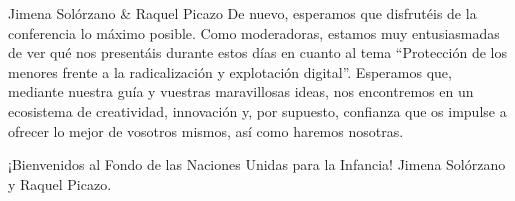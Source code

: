 \begin{chairletter}{Jimena Solórzano \& Raquel Picazo}
De nuevo, esperamos que disfrutéis de la conferencia lo máximo posible. Como moderadoras, estamos muy entusiasmadas de ver qué nos presentáis durante estos días en cuanto al tema “Protección de los menores frente a la radicalización y explotación digital”. Esperamos que, mediante nuestra guía y vuestras maravillosas ideas, nos encontremos en un ecosistema de creatividad, innovación y, por supuesto, confianza que os impulse a ofrecer lo mejor de vosotros mismos, así como haremos nosotras.

¡Bienvenidos al Fondo de las Naciones Unidas para la Infancia! Jimena Solórzano y Raquel Picazo.

\end{chairletter}
